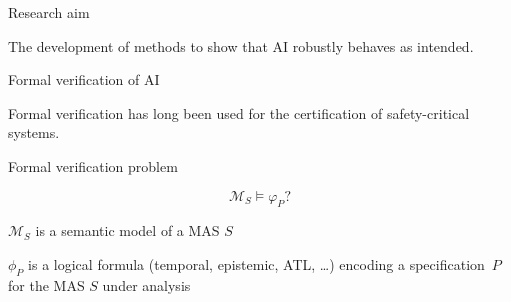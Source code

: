 \documentclass[10pt]{beamer}
\begin{document}

\begin{frame}{Research aim}
		
	The development of methods to show that AI \alert{robustly behaves as
	intended}.

\end{frame}


\begin{frame}{Formal verification of AI}
	
	Formal verification has long been used for the certification of
	safety-critical systems.

	\begin{block}{Formal verification problem}
			\begin{large}
		
		\[
			\mathcal M_S \models \varphi_P ?
		\]

			\end{large}

	\end{block}

	\alert{$\mathcal{M}_S$} is a semantic model of a MAS $S$
	\begin{center}
		
	\end{center}
	\alert{$\phi_P$} is a logical formula (temporal, epistemic,
	ATL, \ldots) encoding a specification~$P$ for the MAS $S$ under
	analysis


\end{frame}

\end{document}
